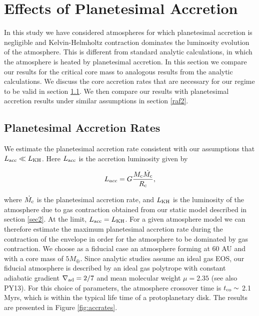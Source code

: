 \documentclass[apj]{emulateapj}
\newcommand{\delad}{\nabla_{\rm ad}}
\begin{document}
\section{Effects of Planetesimal Accretion}
\label{acc}

In this study we have considered atmospheres for which planetesimal accretion is negligible and Kelvin-Helmholtz contraction dominates the luminosity evolution of the atmosphere. This is different from standard analytic calculations, in which the atmosphere is heated by planetesimal accretion. In this section we compare our results for the critical core mass to analogous results from the analytic calculations. We discuss the core accretion rates that are necessary for our regime to be valid in section \ref{raf1}. We then compare our results with planetesimal accretion results under similar assumptions in section \ref{raf2}.


\subsection{Planetesimal Accretion Rates}
\label{raf1}

We estimate the planetesimal accretion rate consistent with our assumptions that $L_{\mathrm{acc}} \ll L_{\rm{KH}}$. Here $L_{\rm{acc}}$ is the accretion luminosity given by

\begin{equation}
\label{eq:Lacc}
L_{acc}=G \frac{M_{\rm{c}} \dot{M_{\rm{c}}}}{R_{\rm{c}}},
\end{equation}

\noindent where $\dot{M_{\rm{c}}}$ is the planetesimal accretion rate, and $L_{\rm{KH}}$ is the luminosity of the atmosphere due to gas contraction obtained from our static model described in section \ref{sec2}. At the limit, $L_{\rm{acc}}=L_{\rm{KH}}$. For a given atmosphere model we can therefore estimate the maximum planetesimal accretion rate during the contraction of the envelope in order for the atmosphere to be dominated by gas contraction. We choose as a fiducial case an atmosphere forming at 60 AU and with a core mass of $5 M_{\oplus}$. Since analytic studies assume an ideal gas EOS, our fiducial atmosphere is described by an ideal gas polytrope with constant adiabatic gradient $\delad=2/7$ and mean molecular weight $\mu=2.35$ (see also PY13). For this choice of parameters, the atmosphere crossover time is $t _{\rm{co}}\sim$ 2.1 Myrs, which is within the typical life time of a protoplanetary disk. The results are presented in Figure \ref{fig:accrates}. 
\end{document}
